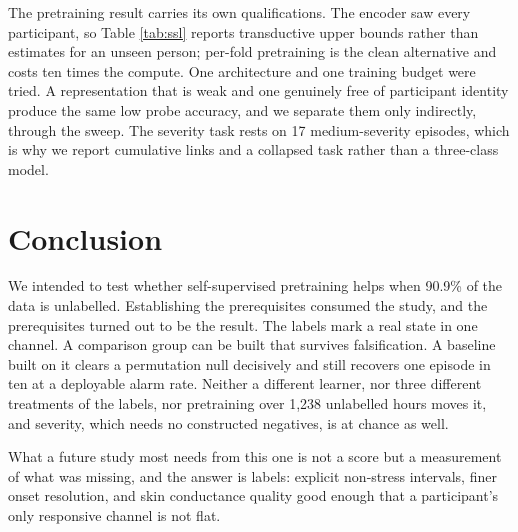 The pretraining result carries its own qualifications. The encoder saw every
participant, so Table \ref{tab:ssl} reports transductive upper bounds rather
than estimates for an unseen person; per-fold pretraining is the clean
alternative and costs ten times the compute. One architecture and one training
budget were tried. A representation that is weak and one genuinely free of
participant identity produce the same low probe accuracy, and we separate them
only indirectly, through the sweep. The severity task rests on 17
medium-severity episodes, which is why we report cumulative links and a
collapsed task rather than a three-class model.

\section{Conclusion}

We intended to test whether self-supervised pretraining helps when 90.9\% of
the data is unlabelled. Establishing the prerequisites consumed the study, and
the prerequisites turned out to be the result. The labels mark a real state in
one channel. A comparison group can be built that survives falsification. A
baseline built on it clears a permutation null decisively and still recovers
one episode in ten at a deployable alarm rate. Neither a different learner, nor
three different treatments of the labels, nor pretraining over 1{,}238
unlabelled hours moves it, and severity, which needs no constructed negatives,
is at chance as well.

What a future study most needs from this one is not a score but a measurement
of what was missing, and the answer is labels: explicit non-stress intervals,
finer onset resolution, and skin conductance quality good enough that a
participant's only responsive channel is not flat.

